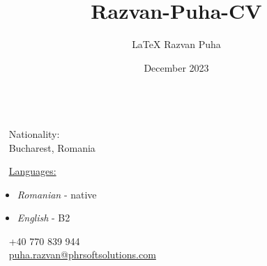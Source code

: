 \documentclass{modernsimplecv}
\title{Razvan-Puha-CV}
\author{\LaTeX{} Razvan Puha}
\date{December 2023}
\begin{document}
    \pagestyle{fancy}
    \fancyhf{} %
    \begin{minipage}[t]{\textwidth}
        \vspace{0pt} %
        \begin{shaded*}
            \begin{multicols}{2}
                \begin{minipage}[t]{0.4\textwidth}
                    \vspace{0pt} %
                    {
                        \par\centering\huge{}
                    } \\[0.3cm]
                    
                    \faGlobe~ Nationality:  \\
                    \faLocationArrow~ Bucharest, Romania \\
            
                    {
                        \small
                        \faComments~ \underline{Languages:} 
                        \begin{itemize}
                            \item \emph{Romanian} - native
                            \item \emph{English} - B2
                        \end{itemize}
                    }
                \end{minipage}
            
                \hfill
            
                \begin{minipage}[t]{0.4\textwidth}
                    \vspace{0pt} %
                    \vspace{1cm}
                    \faPhone~ +40 770 839 944 \\
                    \faAt~ \href{mailto:puha.razvan@phrsoftsolutions.com}{\url{puha.razvan@phrsoftsolutions.com}} \\
                    

\end{minipage}
\end{multicols}
\end{shaded*}
\end{minipage}
\end{document}

